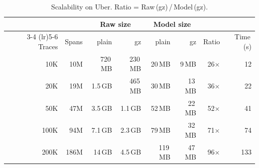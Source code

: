 \begin{table}[t]
    \centering
    \caption{Scalability on Uber. Ratio = Raw\,(gz)\,/\,Model\,(gz).}
    \label{tab:scalability}
    \footnotesize
    \setlength{\tabcolsep}{3.5pt}
    \begin{tabular}{rr rr rr rr}
        \toprule
        & & \multicolumn{2}{c}{Raw size} & \multicolumn{2}{c}{Model size} & & \\
        \cmidrule(lr){3-4} \cmidrule(lr){5-6}
        Traces & Spans & plain & gz & plain & gz & Ratio & Time\,(s) \\
        \midrule
        10K & 10M & 720\,MB & 230\,MB & 20\,MB & 9\,MB & 26$\times$ & 12 \\
        20K & 19M & 1.5\,GB & 465\,MB & 30\,MB & 13\,MB & 36$\times$ & 22 \\
        50K & 47M & 3.5\,GB & 1.1\,GB & 52\,MB & 22\,MB & 52$\times$ & 41 \\
        100K & 94M & 7.1\,GB & 2.3\,GB & 79\,MB & 32\,MB & 71$\times$ & 74 \\
        200K & 186M & 14\,GB & 4.5\,GB & 119\,MB & 47\,MB & 96$\times$ & 133 \\
        \bottomrule
    \end{tabular}
\end{table}
